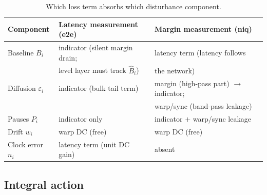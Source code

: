 \documentclass[11pt, a4paper]{article}
\theoremstyle{definition}
\theoremstyle{plain}
\theoremstyle{remark}
\begin{document}
\begin{table}[h]
\centering
\caption{Which loss term absorbs which disturbance component.}
\label{tab:ledger}
\begin{tabular}{@{}lll@{}}
\toprule
Component & Latency measurement (e2e) & Margin measurement (niq)\\
\midrule
Baseline $B_i$ & indicator (silent margin drain; & latency term
  (latency follows \\
 & level layer must track $\hat B_i$) & the network) \\
Diffusion $\varepsilon_i$ & indicator (bulk tail term) & margin
  (high-pass part) $\to$ indicator; \\
 & & warp/sync (band-pass leakage) \\
Pauses $P_i$ & indicator only & indicator $+$ warp/sync leakage \\
Drift $w_i$ & warp DC (free) & warp DC (free) \\
Clock error $n_i$ & latency term (unit DC gain) & absent \\
\bottomrule
\end{tabular}
\end{table}

\subsection{Integral action}\label{sec:integral}
\end{document}
